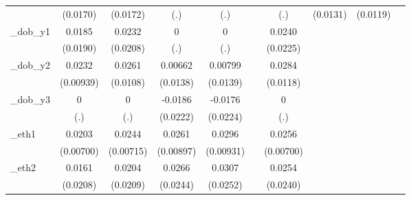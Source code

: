 \begin{table}[htbp]
\begin{tabular}{l*{9}{c}}
            &    (0.0170)         &    (0.0172)         &         (.)         &         (.)         &                     &         (.)         &    (0.0131)         &    (0.0119)         &                     \\
[1em]
\_dob\_y1     &      0.0185         &      0.0232         &           0         &           0         &                     &      0.0240         &                     &                     &                     \\
            &    (0.0190)         &    (0.0208)         &         (.)         &         (.)         &                     &    (0.0225)         &                     &                     &                     \\
[1em]
\_dob\_y2     &      0.0232\sym{**} &      0.0261\sym{**} &     0.00662         &     0.00799         &                     &      0.0284\sym{**} &                     &                     &                     \\
            &   (0.00939)         &    (0.0108)         &    (0.0138)         &    (0.0139)         &                     &    (0.0118)         &                     &                     &                     \\
[1em]
\_dob\_y3     &           0         &           0         &     -0.0186         &     -0.0176         &                     &           0         &                     &                     &                     \\
            &         (.)         &         (.)         &    (0.0222)         &    (0.0224)         &                     &         (.)         &                     &                     &                     \\
[1em]
\_eth1       &      0.0203\sym{***}&      0.0244\sym{***}&      0.0261\sym{***}&      0.0296\sym{***}&                     &      0.0256\sym{***}&                     &                     &                     \\
            &   (0.00700)         &   (0.00715)         &   (0.00897)         &   (0.00931)         &                     &   (0.00700)         &                     &                     &                     \\
[1em]
\_eth2       &      0.0161         &      0.0204         &      0.0266         &      0.0307         &                     &      0.0254         &                     &                     &                     \\
            &    (0.0208)         &    (0.0209)         &    (0.0244)         &    (0.0252)         &                     &    (0.0240)         &                     &                     &                     \\

\end{tabular}
\end{table}
